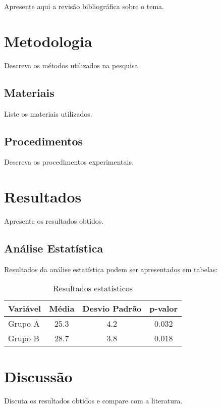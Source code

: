 Apresente aqui a revisão bibliográfica sobre o tema.

\section{Metodologia}

Descreva os métodos utilizados na pesquisa.

\subsection{Materiais}

Liste os materiais utilizados.

\subsection{Procedimentos}

Descreva os procedimentos experimentais.

\section{Resultados}

Apresente os resultados obtidos.

\subsection{Análise Estatística}

Resultados da análise estatística podem ser apresentados em tabelas:

\begin{table}[h]
  \centering
  \begin{tabular}{|l|c|c|c|}
    \hline
    \textbf{Variável} & \textbf{Média} & \textbf{Desvio Padrão} & \textbf{p-valor} \\
    \hline
    Grupo A & 25.3 & 4.2 & 0.032 \\
    Grupo B & 28.7 & 3.8 & 0.018 \\
    \hline
  \end{tabular}
  \caption{Resultados estatísticos}
  \label{tab:resultados}
\end{table}

\section{Discussão}

Discuta os resultados obtidos e compare com a literatura.

